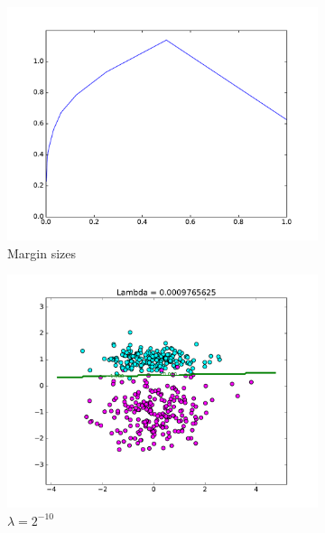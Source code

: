 \documentclass[10pt,psamsfonts]{amsart}
\theoremstyle{definition}
\theoremstyle{remark}
\numberwithin{equation}{section}
\begin{document}
\begin{figure}
	\centering
	\begin{subfigure}[b]{0.23\textwidth}
		\includegraphics[width=\textwidth]{hw2_3-2_margins.pdf}
		\caption{Margin sizes}
	\end{subfigure}
	\begin{subfigure}[b]{0.23\textwidth}
		\includegraphics[width=\textwidth]{hw2_3-2_11.pdf}
		\caption{$\lambda = 2^{-10}$}
	\end{subfigure}
	\begin{subfigure}[b]{0.23\textwidth}

\end{subfigure}
\end{figure}
\end{document}
